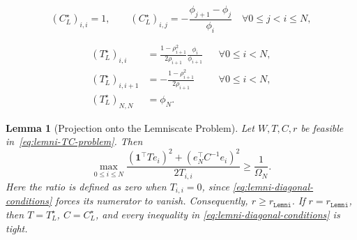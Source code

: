 \documentclass[10pt,a4paper]{amsart}
\newtheorem{lemma}{Lemma}
\begin{document}
\begin{equation}\label{eq:lemni-C-star}
    (C_L^\star)_{i,i}=1,
    \qquad
    (C_L^\star)_{i,j}=-\frac{\phi_{j+1}-\phi_j}{\phi_i}
    \quad \forall 0\leq j<i\leq N,
\end{equation}

\begin{equation}\label{eq:lemni-T-star}
\begin{aligned}
    (T_L^\star)_{i,i}
    &=\frac{1-\rho_{i+1}^2}{2\rho_{i+1}}
      \frac{\phi_i}{\phi_{i+1}}
      &&\forall 0\leq i<N,\\
    (T_L^\star)_{i,i+1}
    &=-\frac{1-\rho_{i+1}^2}{2\rho_{i+1}}
      &&\forall 0\leq i<N,\\
    (T_L^\star)_{N,N}&=\phi_N.
\end{aligned}
\end{equation}

\begin{lemma}[Projection onto the Lemniscate Problem]\label{lem:lemni-TC-projection}
Let $W,T,C,r$ be feasible in~\eqref{eq:lemni-TC-problem}. Then
\begin{equation}\label{eq:lemni-projection-bound}
    \max_{0\leq i\leq N}
    \frac{(\mathbf1^\top Te_i)^2
    +(e_N^\top C^{-1}e_i)^2}{2T_{i,i}}
    \geq \frac1{\Omega_N}.
\end{equation}
Here the ratio is defined as zero when $T_{i,i}=0$, since
\eqref{eq:lemni-diagonal-conditions} forces its numerator to vanish.
Consequently, $r\geq r_\mathtt{Lemni}$. If $r=r_\mathtt{Lemni}$, then
$T=T_L^\star$, $C=C_L^\star$, and every inequality in
\eqref{eq:lemni-diagonal-conditions} is tight.
\end{lemma}
\end{document}
